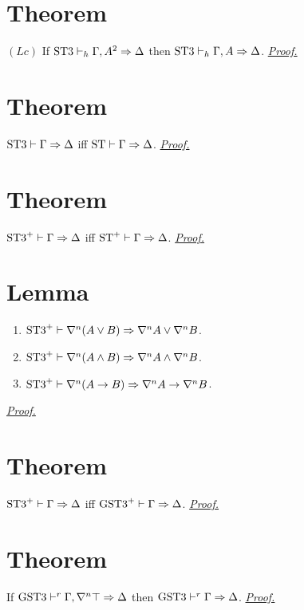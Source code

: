 \documentclass[a4paper, 12pt]{paper}
\begin{document}
\section{Theorem}\label{thm:stt-lc-elim} $(Lc)$ If $\text{ST3} \vdash_h \Gamma, A^2 \Rightarrow \Delta$ then $\text{ST3} \vdash_h \Gamma, A \Rightarrow \Delta$.
\hyperref[pr:stt-lc-elim]{\emph{Proof.}}



\section{Theorem}\label{thm:stt-eq-st} $\text{ST3} \vdash \Gamma \Rightarrow \Delta$ iff $\text{ST} \vdash \Gamma \Rightarrow \Delta$.
\hyperref[pr:stt-eq-st]{\emph{Proof.}}



\section{Theorem}\label{thm:sttp-eq-stp} $\text{ST3}^+ \vdash \Gamma \Rightarrow \Delta$ iff $\text{ST}^+ \vdash \Gamma \Rightarrow \Delta$.
\hyperref[pr:sttp-eq-stp]{\emph{Proof.}}



\section{Lemma}\label{lem:l-nabla-dist}
\begin{enumerate}
  \item $\text{ST3}^+ \vdash \nabla^n (A \vee B) \Rightarrow \nabla^n A \vee \nabla^n B$.

  \item $\text{ST3}^+ \vdash \nabla^n (A \wedge B) \Rightarrow \nabla^n A \wedge \nabla^n B$. 

  \item $\text{ST3}^+ \vdash \nabla^n (A \rightarrow B) \Rightarrow \nabla^n A \rightarrow \nabla^n B$.
\end{enumerate}
\hyperref[pr:l-nabla-dist]{\emph{Proof.}}



\section{Theorem}\label{thm:sttp-eq-gsttp} $\text{ST3}^+ \vdash \Gamma \Rightarrow \Delta$ iff $\text{GST3}^+ \vdash \Gamma \Rightarrow \Delta$. \hyperref[pr:sttp-eq-gsttp]{\emph{Proof.}}



\section{Theorem}\label{lem:gstt-top-redundant}
If $\text{GST3} \vdash^r \Gamma , \nabla^n \top \Rightarrow \Delta$ then $\text{GST3} \vdash^r \Gamma \Rightarrow \Delta$.
\hyperref[pr:gstt-top-redundant]{\emph{Proof.}}
\end{document}
